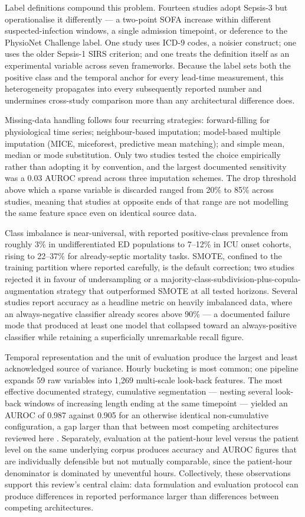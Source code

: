 \documentclass[conference]{IEEEtran}
\begin{document}
Label definitions compound this problem. Fourteen studies adopt Sepsis-3 but operationalise it differently --- a two-point SOFA increase within different suspected-infection windows, a single admission timepoint, or deference to the PhysioNet Challenge label. One study uses ICD-9 codes, a noisier construct; one uses the older Sepsis-1 SIRS criterion; and one treats the definition itself as an experimental variable across seven frameworks. Because the label sets both the positive class and the temporal anchor for every lead-time measurement, this heterogeneity propagates into every subsequently reported number and undermines cross-study comparison more than any architectural difference does.

Missing-data handling follows four recurring strategies: forward-filling for physiological time series; neighbour-based imputation; model-based multiple imputation (MICE, miceforest, predictive mean matching); and simple mean, median or mode substitution. Only two studies tested the choice empirically rather than adopting it by convention, and the largest documented sensitivity was a 0.03 AUROC spread across three imputation schemes. The drop threshold above which a sparse variable is discarded ranged from 20\% to 85\% across studies, meaning that studies at opposite ends of that range are not modelling the same feature space even on identical source data.

Class imbalance is near-universal, with reported positive-class prevalence from roughly 3\% in undifferentiated ED populations to 7--12\% in ICU onset cohorts, rising to 22--37\% for already-septic mortality tasks. SMOTE, confined to the training partition where reported carefully, is the default correction; two studies rejected it in favour of undersampling or a majority-class-subdivision-plus-copula-augmentation strategy that outperformed SMOTE at all tested horizons. Several studies report accuracy as a headline metric on heavily imbalanced data, where an always-negative classifier already scores above 90\% --- a documented failure mode that produced at least one model that collapsed toward an always-positive classifier while retaining a superficially unremarkable recall figure.

Temporal representation and the unit of evaluation produce the largest and least acknowledged source of variance. Hourly bucketing is most common; one pipeline expands 59 raw variables into 1,269 multi-scale look-back features. The most effective documented strategy, cumulative segmentation --- nesting several look-back windows of increasing length ending at the same timepoint --- yielded an AUROC of 0.987 against 0.905 for an otherwise identical non-cumulative configuration, a gap larger than that between most competing architectures reviewed here \cite{r33}. Separately, evaluation at the patient-hour level versus the patient level on the same underlying corpus produces accuracy and AUROC figures that are individually defensible but not mutually comparable, since the patient-hour denominator is dominated by uneventful hours. Collectively, these observations support this review's central claim: data formulation and evaluation protocol can produce differences in reported performance larger than differences between competing architectures.
\end{document}
